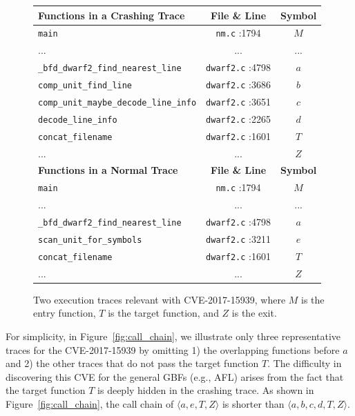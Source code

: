 \begin{figure}[t]
	\centering
	\myeqsize \begin{tabular}{lcc}
		\hline
  \textbf{Functions in a Crashing Trace} &  	\textbf{File \& Line} & \textbf{Symbol} \\\hline
  	 \texttt{main}   &   \texttt{nm.c} :1794     & \textsf{$M$}\\
 	   ... &  ...  &...  \\
 	 \texttt{\_bfd\_dwarf2\_find\_nearest\_line}     &   \texttt{dwarf2.c} :4798   &  \textsf{$a$}\\
 	 \texttt{comp\_unit\_find\_line}    &   \texttt{dwarf2.c} :3686    & \textsf{$b$}\\
 	 \texttt{comp\_unit\_maybe\_decode\_line\_info} &	 \texttt{dwarf2.c} :3651       &  \textsf{$c$}\\
  	 \texttt{decode\_line\_info}   &    \texttt{dwarf2.c} :2265     &  \textsf{$d$} \\
\texttt{concat\_filename}   &   \texttt{dwarf2.c} :1601     &  \textsf{$T$}\\
    ... 	 	  &     ... 	  &  \textsf{$Z$}\\\hline
	  \textbf{Functions in a Normal Trace} &  	\textbf{File \& Line} & \textbf{Symbol} \\\hline
	   \texttt{main}   &   \texttt{nm.c} :1794     &  \textsf{$M$}\\
	      ... &  ...  &...  \\
	   \texttt{\_bfd\_dwarf2\_find\_nearest\_line}     & \texttt{dwarf2.c} :4798      & \textsf{$a$}\\
	  \texttt{scan\_unit\_for\_symbols}    &      \texttt{dwarf2.c} :3211        &  \textsf{$e$}\\
  \texttt{concat\_filename}   &  \texttt{dwarf2.c} :1601      &  \textsf{$T$}\\
	    ... 	 	  &     ...       & \textsf{$Z$}\\\hline
	\end{tabular}
\vspace{-5pt}
	\caption{Two execution traces relevant with CVE-2017-15939, where $M$ is the entry function, $T$ is the target function, and $Z$ is the exit.}
	\label{fig:exam_trace}
\end{figure}



For simplicity, in Figure~\ref{fig:call_chain}, we illustrate only three representative traces for the CVE-2017-15939 by omitting 1) the overlapping functions before $a$ and 2) the other traces that do not pass the target function $T$. {The difficulty in discovering this CVE for the general GBFs (e.g., AFL) arises from the fact that the target function $T$ is deeply hidden in the crashing trace.} As shown in Figure~\ref{fig:call_chain}, the call chain of $\langle a, e, T, Z\rangle$ is shorter than $\langle a, b, c, d, T, Z\rangle$.

